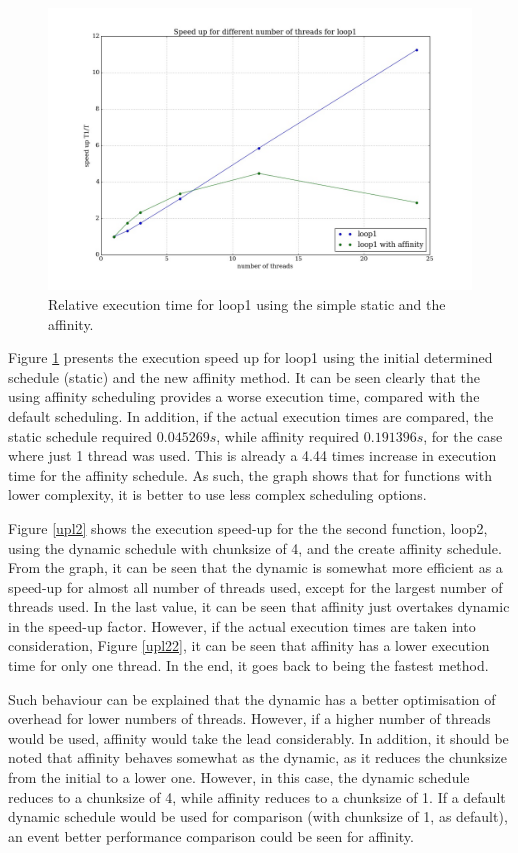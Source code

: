 \documentclass[12pt]{article}
\begin{document}
	\begin{figure}[H]	
		\centering
		\includegraphics[scale=0.4]{speed_up_l1.jpeg}
		\caption{Relative execution time for loop1 using the simple static and the affinity. }\label{upl1}
	\end{figure}
	
	Figure \ref{upl1} presents the execution speed up for loop1 using the initial determined schedule (static) and the new affinity method. It can be seen clearly that the using affinity scheduling provides a worse execution time, compared with the default scheduling. In addition, if the actual execution times are compared, the static schedule required $0.045269s$, while affinity required $0.191396s$, for the case where just 1 thread was used. This is already a 4.44 times increase in execution time for the affinity schedule. As such, the graph shows that for functions with lower complexity, it is better to use less complex scheduling options.
	
	Figure \ref{upl2} shows the execution speed-up for the the second function, loop2, using the dynamic schedule with chunksize of 4, and the create affinity schedule. From the graph, it can be seen that the dynamic is somewhat more efficient as a speed-up for almost all number of threads used, except for the largest number of threads used. In the last value, it can be seen that affinity just overtakes dynamic in the speed-up factor. However, if the actual execution times are taken into consideration, Figure \ref{upl22}, it can be seen that affinity has a lower execution time for only one thread. In the end, it goes back to being the fastest method. 
	
	Such behaviour can be explained that the dynamic has a better optimisation of overhead for lower numbers of threads. However, if a higher number of threads would be used, affinity would take the lead considerably. In addition, it should be noted that affinity behaves somewhat as the dynamic, as it reduces the chunksize from the initial to a lower one. However, in this case, the dynamic schedule reduces to a chunksize of 4, while affinity reduces to a chunksize of 1. If a default dynamic schedule would be used for comparison (with chunksize of 1, as default), an event better performance comparison could be seen for affinity. 
	
\end{document}
